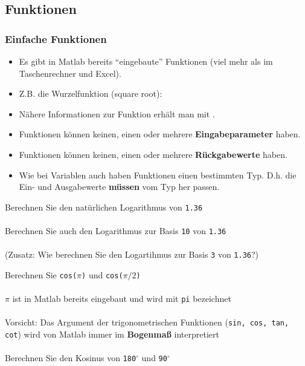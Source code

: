   \subsection{Funktionen}
  \begin{frame}
    \frametitle{Einfache Funktionen}
    \begin{itemize}
      \item Es gibt in Matlab bereits ``eingebaute'' Funktionen (viel mehr als im Taschenrechner und Excel).
      \item Z.B. die Wurzelfunktion (square root): 
      \item Nähere Informationen zur Funktion  erhält man mit .
      \item Funktionen können keinen, einen oder mehrere \textbf{Eingabeparameter} haben.
      \item Funktionen können keinen, einen oder mehrere \textbf{Rückgabewerte} haben.
      \item Wie bei Variablen auch haben Funktionen einen bestimmten Typ. D.h. die Ein- und Ausgabewerte \textbf{müssen} vom Typ her passen.
    \end{itemize}
  \end{frame}

  \secMexercise
  \begin{frame}
    \frameMexercise
    \begin{exercise}
        Berechnen Sie den natürlichen Logarithmus von \texttt{1.36} \\ \\
        Berechnen Sie auch den Logarithmus zur Basis \texttt{10} von \texttt{1.36} \\ \\
        (Zusatz: Wie berechnen Sie den Logartihmus zur Basis \texttt{3} von \texttt{1.36}?)
    \end{exercise}
\end{frame}

\secMexercise
\begin{frame}
  \frameMexercise
  \begin{exercise}
      Berechnen Sie \texttt{cos($\pi$)} und \texttt{cos($\pi / 2$)} \\ \\
      $\pi$ ist in Matlab bereits eingebaut und wird mit \texttt{pi} bezeichnet \\ \\
      \alert{Vorsicht}: Das Argument der trigonometrischen Funktionen (\texttt{sin, cos, tan, cot}) wird von Matlab immer im \textbf{Bogenmaß} interpretiert \\ \\
      Berechnen Sie den Kosinus von \texttt{180$^{\circ}$} und \texttt{90$^{\circ}$}
  \end{exercise}
\end{frame}


